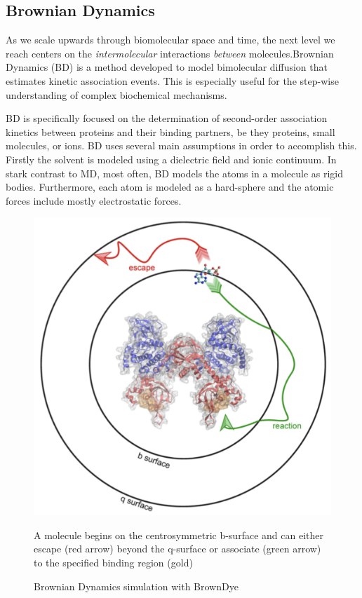 \documentclass[12pt]{ucsddissertation}
\begin{document}
\begin{dissertationintroduction}
\subsection{Brownian Dynamics}
As we scale upwards through biomolecular space and time, the next level we reach centers on the \textit{intermolecular} interactions \textit{between} molecules.Brownian Dynamics (BD) is a method developed to model bimolecular diffusion that estimates kinetic association events. This is especially useful for the step-wise understanding of complex biochemical mechanisms. 

BD is specifically focused on the determination of second-order association kinetics between proteins and their binding partners, be they proteins, small molecules, or ions. BD uses several main assumptions in order to accomplish this. Firstly the solvent is modeled using a dielectric field and ionic continuum. In stark contrast to MD, most often, BD models the atoms in a molecule as rigid bodies. Furthermore, each atom is modeled as a hard-sphere and the atomic forces include mostly electrostatic forces. 

\setcounter{figure}{3}
\begin{figure}
\centerline{\includegraphics[scale=0.3]{BD.png}}
	\caption{Brownian Dynamics simulation with BrownDye} A molecule begins on the centrosymmetric b-surface and can either escape (red arrow) beyond the q-surface or associate (green arrow) to the specified binding region (gold)
\end{figure}


\end{dissertationintroduction}
\end{document}
